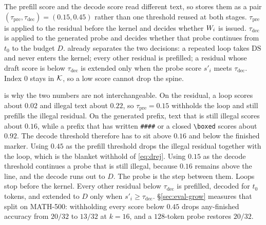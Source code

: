 The prefill score and the decode score read different text, so \sys stores them as a pair $(\tau_{\mathrm{pre}},\tau_{\mathrm{dec}})=(0.15,0.45)$ rather than one threshold reused at both stages.
$\tau_{\mathrm{pre}}$ is applied to the residual before the kernel and decides whether $W_i$ is issued.
$\tau_{\mathrm{dec}}$ is applied to the generated probe and decides whether that probe continues from $t_0$ to the budget $D$.
 already separates the two decisions: a repeated loop takes $\mathrm{DS}$ and never enters the kernel; every other residual is prefilled; a residual whose draft score is below $\tau_{\mathrm{dec}}$ is extended only when the probe score $s'_i$ meets $\tau_{\mathrm{dec}}$.
Index $0$ stays in $\mathcal{K}$, so a low score cannot drop the spine.

 is why the two numbers are not interchangeable.
On the residual, a loop scores about $0.02$ and illegal text about $0.22$, so $\tau_{\mathrm{pre}}{=}0.15$ withholds the loop and still prefills the illegal residual.
On the generated prefix, text that is still illegal scores about $0.16$, while a prefix that has written \texttt{\#\#\#\#} or a closed \texttt{\textbackslash boxed} scores about $0.92$.
The decode threshold therefore has to sit above $0.16$ and below the finished marker.
Using $0.45$ as the prefill threshold drops the illegal residual together with the loop, which is the blanket withhold of \eqref{eq:drej}.
Using $0.15$ as the decode threshold continues a probe that is still illegal, because $0.16$ remains above the line, and the decode runs out to $D$.
The probe is the step between them.
Loops stop before the kernel.
Every other residual below $\tau_{\mathrm{dec}}$ is prefilled, decoded for $t_0$ tokens, and extended to $D$ only when $s'_i\ge\tau_{\mathrm{dec}}$.
\S\ref{sec:eval-grow} measures that split on MATH-500: withholding every score below $0.45$ drops any-finished accuracy from $20/32$ to $13/32$ at $k{=}16$, and a $128$-token probe restores $20/32$.

